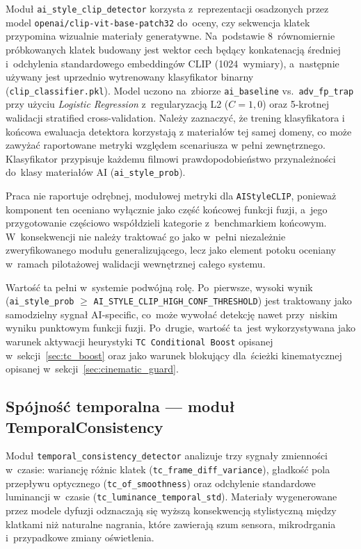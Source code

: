 Moduł \texttt{ai\_style\_clip\_detector} korzysta z~reprezentacji osadzonych
przez model \texttt{openai/clip-vit-base-patch32} do~oceny, czy sekwencja klatek
przypomina wizualnie materiały generatywne. Na~podstawie 8~równomiernie
próbkowanych klatek budowany jest wektor cech będący konkatenacją średniej
i~odchylenia standardowego embeddingów CLIP (1024~wymiary), a~następnie
używany jest uprzednio wytrenowany klasyfikator binarny
(\texttt{clip\_classifier.pkl}). Model uczono na~zbiorze \texttt{ai\_baseline}
vs.\ \texttt{adv\_fp\_trap} przy użyciu \textit{Logistic Regression}
z~regularyzacją L2 ($C=1{,}0$) oraz 5-krotnej walidacji stratified cross-validation.
Należy zaznaczyć, że trening klasyfikatora i końcowa ewaluacja detektora
korzystają z materiałów tej samej domeny, co może zawyżać raportowane metryki
względem scenariusza w pełni zewnętrznego.
Klasyfikator przypisuje każdemu filmowi prawdopodobieństwo przynależności
do~klasy materiałów AI (\texttt{ai\_style\_prob}).

Praca nie raportuje odrębnej, modułowej metryki dla \texttt{AIStyleCLIP},
ponieważ komponent ten oceniano wyłącznie jako część końcowej funkcji fuzji,
a~jego przygotowanie częściowo współdzieli kategorie z~benchmarkiem końcowym.
W~konsekwencji nie należy traktować go jako w~pełni niezależnie zweryfikowanego
modułu generalizującego, lecz jako element potoku oceniany w~ramach pilotażowej
walidacji wewnętrznej całego systemu.

Wartość ta pełni w~systemie podwójną rolę. Po~pierwsze, wysoki wynik
(\texttt{ai\_style\_prob} $\geq$ \texttt{AI\_STYLE\_CLIP\_HIGH\_CONF\_THRESHOLD})
jest traktowany jako samodzielny sygnał AI-specific, co~może wywołać
detekcję nawet przy~niskim wyniku punktowym funkcji fuzji.
Po~drugie, wartość ta~jest wykorzystywana jako warunek aktywacji
heurystyki \texttt{TC Conditional Boost} opisanej w~sekcji~\ref{sec:tc_boost}
oraz jako warunek blokujący dla~ścieżki kinematycznej opisanej
w~sekcji~\ref{sec:cinematic_guard}.

\subsection*{Spójność temporalna --- moduł TemporalConsistency}

Moduł \texttt{temporal\_consistency\_detector} analizuje trzy sygnały
zmienności w~czasie: wariancję różnic klatek (\texttt{tc\_frame\_diff\_variance}),
gładkość pola przepływu optycznego (\texttt{tc\_of\_smoothness})
oraz odchylenie standardowe luminancji w~czasie (\texttt{tc\_luminance\_temporal\_std}).
Materiały wygenerowane przez modele dyfuzji odznaczają się wyższą
konsekwencją stylistyczną między klatkami niż naturalne nagrania,
które zawierają szum sensora, mikrodrgania i~przypadkowe zmiany oświetlenia.

